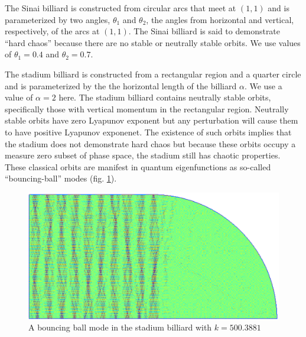 \documentclass{report}
\begin{document}
The Sinai billiard is constructed from circular arcs that meet at $(1,1)$ and is parameterized by two angles, $\theta_{1}$ and $\theta_{2}$, the angles from horizontal and vertical, respectively, of the arcs at $(1,1)$. The Sinai billiard is said to demonstrate ``hard chaos'' because there are no stable or neutrally stable orbits. We use values of $\theta_{1} = 0.4$ and $\theta_{2} = 0.7$.

The stadium billiard is constructed from a rectangular region and a quarter circle and is parameterized by the the horizontal length of the billiard $\alpha$. We use a value of $\alpha = 2$ here. The stadium billiard contains neutrally stable orbits, specifically those with vertical momentum in the rectangular region. Neutrally stable orbits have zero Lyapunov exponent but any perturbation will cause them to have positive Lyapunov exponenet. The existence of such orbits implies that the stadium does not demonstrate hard chaos but because these orbits occupy a measure zero subset of phase space, the stadium still has chaotic properties. These classical orbits are manifest in quantum eigenfunctions as so-called ``bouncing-ball'' modes (fig. \ref{fig:bouncing_ball_mode}).

\begin{figure}
  \begin{center}
    \includegraphics[width=\textwidth]{figs/classical/stadium_eigenfunction_bouncing_ball_mode.eps}
    \caption{A bouncing ball mode in the stadium billiard with $k = 500.3881$}
    \label{fig:bouncing_ball_mode}
  \end{center}
\end{figure}
\end{document}
